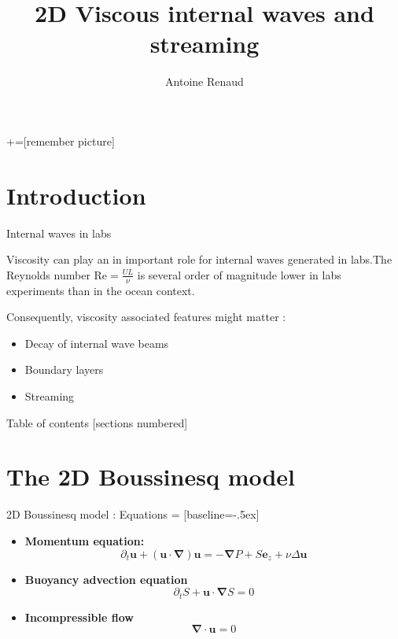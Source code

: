 \documentclass[10pt]{beamer}
\title{2D Viscous internal waves and streaming}
\subtitle{}
\date{}
\author{Antoine Renaud}
\institute{Laboratoire de Physique, ENS Lyon}
\begin{document}
+=[remember picture]
\everymath{\displaystyle}

\maketitle

\section{Introduction}

\begin{frame}[fragile]{Internal waves in labs}

  Viscosity can play an in important role for internal waves generated in labs.The Reynolds number $\mathrm{Re}=\frac{UL}{\nu}$  is several order of magnitude lower  in labs experiments than in the ocean context. 

  Consequently, viscosity associated features might matter :
  \begin{itemize}
    \item Decay of internal wave beams
    \item Boundary layers
    \item Streaming
  \end{itemize}
\end{frame}

\begin{frame}{Table of contents}
  [sections numbered]
  \tableofcontents[hideallsubsections]
\end{frame}

\section{The 2D Boussinesq model}

\begin{frame}[fragile]{2D Boussinesq model : Equations}
   = [baseline=-.5ex]
  \begin{itemize}
    \item \textbf{Momentum equation:}
      \begin{equation*}
        \partial_{t}\mathbf{u}+\left(\mathbf{u}\cdot\boldsymbol{\nabla}\right)\mathbf{u} = -\boldsymbol{\nabla}P+S\mathbf{e}_{z}+\nu\Delta\mathbf{u}  
      \end{equation*}
    \item \textbf{Buoyancy advection equation}
      \begin{equation*}
        \partial_{t}S+\mathbf{u}\cdot\boldsymbol{\nabla}S =0 
      \end{equation*}
    \item \textbf{Incompressible flow} 
      \begin{equation*}
        \boldsymbol{\nabla}\cdot\mathbf{u} =0
      \end{equation*}
  \end{itemize}
\end{frame}
\end{document}
